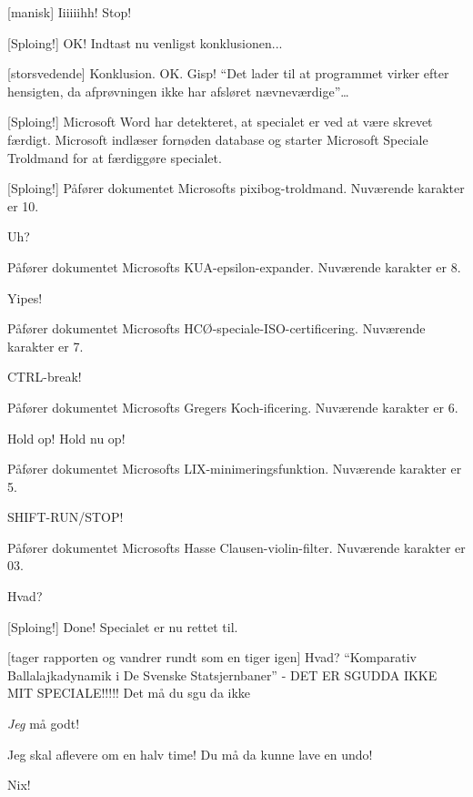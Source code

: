 \documentclass[danish,11pt]{article}
\begin{document}
\begin{sketch}
 [manisk] Iiiiiihh! Stop!


 [Sploing!] OK! Indtast nu venligst konklusionen...

 [storsvedende] Konklusion. OK.  Gisp!
``Det lader til at programmet virker efter hensigten, da afprøvningen
ikke har afsløret nævneværdige''\ldots

 [Sploing!] Microsoft Word har detekteret, at specialet er ved at være
skrevet færdigt. Microsoft ind\-læser fornøden database og starter
Microsoft Speciale Troldmand for at færdiggøre specialet.


 [Sploing!] Påfører dokumentet Microsofts
pixibog-troldmand. Nuværende karakter er 10.

 Uh?

 Påfører dokumentet Microsofts
KUA-epsilon-expander. Nuværende karakter er 8.

 Yipes!

 Påfører dokumentet Microsofts
HCØ-speciale-ISO-certificering. Nuværende karakter er 7.

 CTRL-break!

 Påfører dokumentet Microsofts Gregers
Koch-ificering. Nuværende karakter er 6.

 Hold op! Hold nu op!

 Påfører dokumentet Microsofts
LIX-minimeringsfunktion. Nuværende karakter er 5.

 SHIFT-RUN/STOP!

 Påfører dokumentet Microsofts Hasse Clausen-violin-filter.
Nuværende karakter er 03.

 Hvad?

 [Sploing!] Done! Specialet er nu rettet til. 

 [tager rapporten og vandrer rundt som en tiger igen] Hvad?
``Kom\-parativ Balla\-lajka\-dy\-na\-mik i De Svenske
Stats\-jernbaner'' - DET ER SGUDDA IKKE MIT SPECIALE!!!!!  Det må du sgu da ikke

 {\em Jeg} må godt!

 Jeg skal aflevere om en halv time! Du må da kunne lave en
undo!

 Nix!


\end{sketch}
\end{document}

